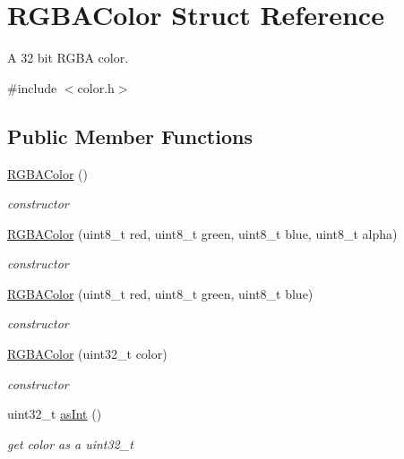 \hypertarget{struct_r_g_b_a_color}{}\section{R\+G\+B\+A\+Color Struct Reference}
\label{struct_r_g_b_a_color}


A 32 bit R\+G\+BA color.  




{\ttfamily \#include $<$color.\+h$>$}

\subsection*{Public Member Functions}
\begin{DoxyCompactItemize}
\item 
\mbox{\label{struct_r_g_b_a_color_ac9d9ea70afb4ce5597d90b06f12b3d41}} 
\hyperlink{struct_r_g_b_a_color_ac9d9ea70afb4ce5597d90b06f12b3d41}{R\+G\+B\+A\+Color} ()
\begin{DoxyCompactList}\small\item\em constructor \end{DoxyCompactList}\item 
\hyperlink{struct_r_g_b_a_color_a40efdde5cc2f64bb3997256c7b89dbff}{R\+G\+B\+A\+Color} (uint8\+\_\+t red, uint8\+\_\+t green, uint8\+\_\+t blue, uint8\+\_\+t alpha)
\begin{DoxyCompactList}\small\item\em constructor \end{DoxyCompactList}\item 
\hyperlink{struct_r_g_b_a_color_a569aa1f50edef6490df126292387f432}{R\+G\+B\+A\+Color} (uint8\+\_\+t red, uint8\+\_\+t green, uint8\+\_\+t blue)
\begin{DoxyCompactList}\small\item\em constructor \end{DoxyCompactList}\item 
\hyperlink{struct_r_g_b_a_color_a62f554a0bc7a82d396f71f801dac624d}{R\+G\+B\+A\+Color} (uint32\+\_\+t color)
\begin{DoxyCompactList}\small\item\em constructor \end{DoxyCompactList}\item 
uint32\+\_\+t \hyperlink{struct_r_g_b_a_color_a9bbae2e2f28e388d589b83ab25f94b6a}{as\+Int} ()
\begin{DoxyCompactList}\small\item\em get color as a uint32\+\_\+t \end{DoxyCompactList}\item 

\end{DoxyCompactItemize}
